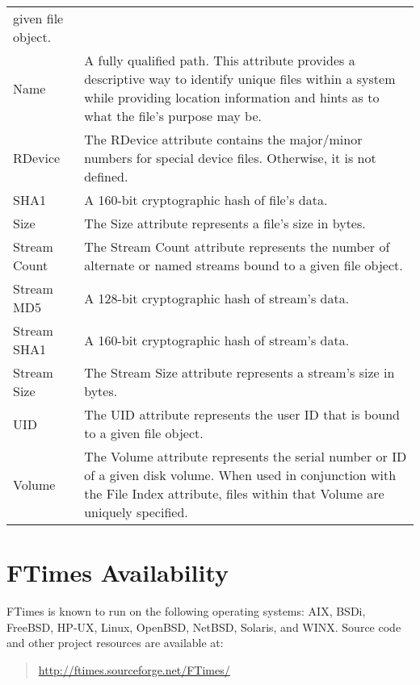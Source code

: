 \documentclass[10pt]{article}
\begin{document}
\begin{center}
\begin{supertabular}{lp{4.75in}}
given file object.
\\[.5em]
Name
&
A fully qualified path.  This attribute provides a descriptive way
to identify unique files within a system while providing location
information and hints as to what the file's purpose may be.
\\[.5em]
RDevice
&
The RDevice attribute contains the major/minor numbers for special
device files.  Otherwise, it is not defined.
\\[.5em]
SHA1
&
A 160-bit cryptographic hash of file's data.
\\[.5em]
Size
&
The Size attribute represents a file's size in bytes.
\\[.5em]
Stream Count
&
The Stream Count attribute represents the number of alternate or
named streams bound to a given file object.
\\[.5em]
Stream MD5
&
A 128-bit cryptographic hash of stream's data.
\\[.5em]
Stream SHA1
&
A 160-bit cryptographic hash of stream's data.
\\[.5em]
Stream Size
&
The Stream Size attribute represents a stream's size in bytes.
\\[.5em]
UID
&
The UID attribute represents the user ID that is bound to a given
file object.
\\[.5em]
Volume
&
The Volume attribute represents the serial number or ID of a given
disk volume.  When used in conjunction with the File Index attribute,
files within that Volume are uniquely specified.
\\[.5em]
\end{supertabular}
\end{center}

\section{FTimes Availability}

FTimes is known to run on the following operating systems: AIX, BSDi,
FreeBSD, HP-UX, Linux, OpenBSD, NetBSD, Solaris, and WINX.  Source
code and other project resources are available at:

\begin{quote}

  \url{http://ftimes.sourceforge.net/FTimes/}

\end{quote}



\end{document}
